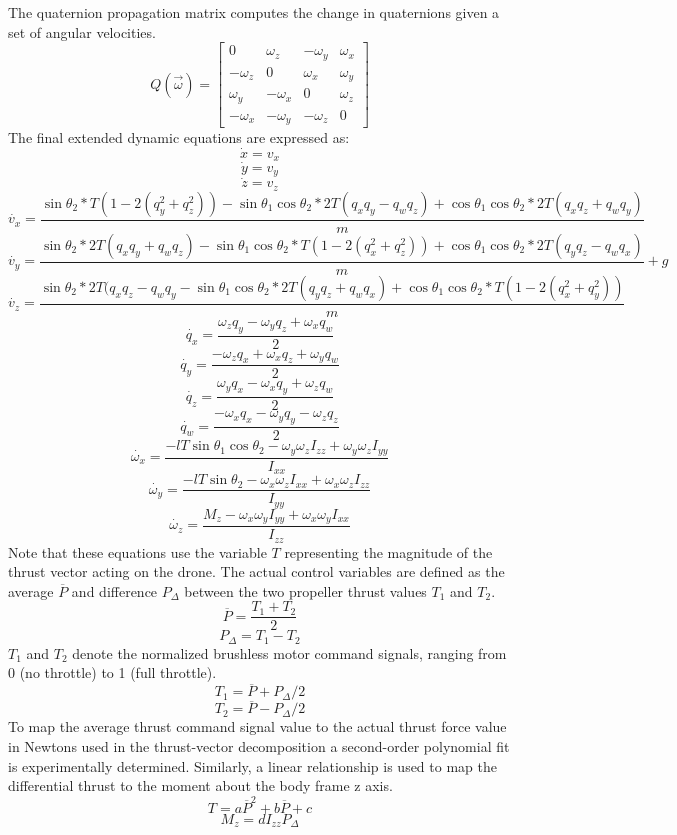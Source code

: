 \documentclass[]{article}
\newcommand{\pdiff}{P_{\Delta}}
\newcommand{\pavg}{\overline{P}}
\begin{document}
The quaternion propagation matrix computes the change in quaternions given a set of angular velocities.
        \[
        Q(\vec{\omega}) =
        \begin{bmatrix}
        0 & \omega_z & -\omega_y & \omega_x \\
        -\omega_z & 0 & \omega_x & \omega_y \\
        \omega_y & -\omega_x & 0 & \omega_z \\
        -\omega_x & -\omega_y & -\omega_z & 0
        \end{bmatrix}
	\]
	The final extended dynamic equations are expressed as:
	\[
		\dot{x} = v_x
	\]
	\[
		\dot{y} = v_y
	\]
	\[
		\dot{z} = v_z
	\]
	\[
		\dot{v_x} = \frac{\sin{\theta_2} *T(1 - 2(q_y^2 + q_z^2))-\sin{\theta_1}\cos{\theta_2}*2T(q_x q_y - q_w q_z)+\cos{\theta_1}\cos{\theta_2}* 2T(q_x q_z + q_w q_y)}{m}
	\]
	\[
		\dot{v_y} =\frac{\sin{\theta_2} *2T(q_x q_y + q_w q_z)-\sin{\theta_1}\cos{\theta_2}*T(1 - 2(q_x^2 + q_z^2))+\cos{\theta_1}\cos{\theta_2}* 2T(q_y q_z - q_w q_x)}{m}+g
	\]
	\[
		\dot{v_z} = \frac{\sin{\theta_2} *2T(q_x q_z - q_w q_y-\sin{\theta_1}\cos{\theta_2}* 2T(q_y q_z + q_w q_x)+\cos{\theta_1}\cos{\theta_2}* T(1 - 2(q_x^2 + q_y^2))}{m}
	\]
	\[
		\dot{q_x} = \frac{\omega_z q_y-\omega_y q_z+ \omega_x q_w}{2}
	\]
	\[
		\dot{q_y} = \frac{-\omega_z q_x+\omega_x q_z+ \omega_y q_w}{2}
	\]
	\[
		\dot{q_z} =  \frac{\omega_y q_x-\omega_x q_y+ \omega_z q_w}{2}
	\]
	\[
		\dot{q_w} =  \frac{-\omega_x q_x - \omega_y q_y - \omega_z q_z}{2}
	\]
	\[
		\dot{\omega_x} = \frac{-lT\sin{\theta_1}\cos{\theta_2}-\omega_y\omega_zI_{zz} + \omega_y\omega_zI_{yy}}{I_{xx}}
	\]
	\[
		\dot{\omega_y} = \frac{-lT\sin{\theta_2}-\omega_x\omega_zI_{xx} + \omega_x\omega_zI_{zz}}{I_{yy}}
	\]
	\[
		\dot{\omega_z} =  \frac{M_z -\omega_x\omega_yI_{yy} + \omega_x\omega_yI_{xx}}{I_{zz}}
	\]
Note that these equations use the variable $T$ representing the magnitude of the thrust vector acting on the drone. 
The actual control variables are defined as the average $\pavg$ and difference $\pdiff$ between the two propeller thrust values $T_1$ and $T_2$. 
	\[
		\pavg =\frac{T_1+T_2}{2}
	\]
	\[
		\pdiff =T_1-T_2
	\]
$T_1$ and $T_2$ denote the normalized brushless motor command signals, ranging from 0 (no throttle) to 1 (full throttle).
	\[
		T_1 = \pavg + \pdiff/2
	\]
	\[
		T_2 = \pavg - \pdiff/2
	\]
To map the average thrust command signal value to the actual thrust force value in Newtons used in the thrust-vector decomposition a second-order polynomial fit is experimentally determined. Similarly, a linear relationship is used to map the differential thrust to the moment about the body frame z axis.
	\[
		T = a\pavg^2+b\pavg+c
	\]
	\[
		M_z = d I_{zz} \pdiff
	\]
\end{document}
